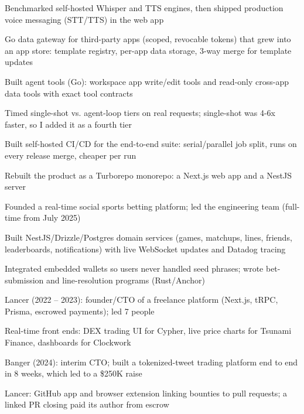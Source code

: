 \documentclass[print]{jack-resume}
\begin{document}
\begin{tightemize}
    \item Benchmarked self-hosted Whisper and TTS engines, then shipped production voice messaging (STT/TTS) in the web app
    \item Go data gateway for third-party apps (scoped, revocable tokens) that grew into an app store: template registry, per-app data storage, 3-way merge for template updates
    \item Built agent tools (Go): workspace app write/edit tools and read-only cross-app data tools with exact tool contracts
    \item Timed single-shot vs. agent-loop tiers on real requests; single-shot was 4-6x faster, so I added it as a fourth tier
    \item Built self-hosted CI/CD for the end-to-end suite: serial/parallel job split, runs on every release merge, cheaper per run
\end{tightemize}
\sectionsep

\begin{tightemize}
    \item Rebuilt the product as a Turborepo monorepo: a Next.js web app and a NestJS server
    \item Founded a real-time social sports betting platform; led the engineering team (full-time from July 2025)
    \item Built NestJS/Drizzle/Postgres domain services (games, matchups, lines, friends, leaderboards, notifications) with live WebSocket updates and Datadog tracing
    \item Integrated embedded wallets so users never handled seed phrases; wrote bet-submission and line-resolution programs (Rust/Anchor)
\end{tightemize}
\sectionsep

\begin{tightemize}
    \item Lancer (2022 -- 2023): founder/CTO of a freelance platform (Next.js, tRPC, Prisma, escrowed payments); led 7 people
    \item Real-time front ends: DEX trading UI for Cypher, live price charts for Tsunami Finance, dashboards for Clockwork
    \item Banger (2024): interim CTO; built a tokenized-tweet trading platform end to end in 8 weeks, which led to a \$250K raise
    \item Lancer: GitHub app and browser extension linking bounties to pull requests; a linked PR closing paid its author from escrow
\end{tightemize}
\sectionsep
\end{document}
